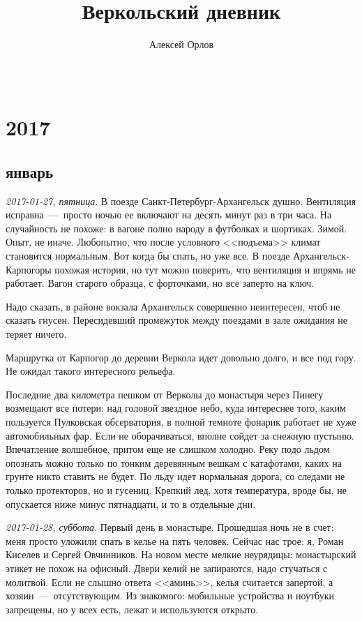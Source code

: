 \documentclass[
    12pt
    ,a4paper
    ,oneside
    ,russian
]{memoir}
\newcommand{\mydatestamp}{
    \bigskip   %
    \emph
}
\newcommand{\mds}{\mydatestamp}
\begin{document}
    \begin{titlingpage}
        \title{Веркольский дневник}
        \author{Алексей Орлов}
        \date{~}
        \maketitle
    \end{titlingpage}
    
    \chapter*{2017}
    \section*{январь}
    
    \mds{2017-01-27, пятница}. В поезде Санкт-Петербург-Архангельск душно. Вентиляция исправна~---~просто ночью ее включают на десять минут раз в три часа. На случайность не похоже: в вагоне полно народу в футболках и шортиках. Зимой. Опыт, не иначе. Любопытно, что после условного <<подъема>> климат становится нормальным. Вот когда бы спать, но уже все. В поезде Архангельск-Карпогоры похожая история, но тут можно поверить, что вентиляция и впрямь не работает. Вагон старого образца, с форточками, но все заперто на ключ.
    
    Надо сказать, в районе вокзала Архангельск совершенно неинтересен, чтоб не сказать гнусен. Пересидевший промежуток между поездами в зале ожидания не теряет ничего.
    
    Маршрутка от Карпогор до деревни Веркола идет довольно долго, и все под гору. Не ожидал такого интересного рельефа.
    
    Последние два километра пешком от Верколы до монастыря через Пинегу возмещают все потери: над головой звездное небо, куда интереснее того, каким пользуется Пулковская обсерватория, в полной темноте фонарик работает не хуже автомобильных фар. Если не оборачиваться, вполне сойдет за снежную пустыню. Впечатление волшебное, притом еще не слишком холодно. Реку подо льдом опознать можно только по тонким деревянным вешкам с катафотами, каких на грунте никто ставить не будет. По льду идет нормальная дорога, со следами не только протекторов, но и гусениц. Крепкий лед, хотя температура, вроде бы, не опускается ниже минус пятнадцати, и то в отдельные дни.
    
    \mds{2017-01-28, суббота}. Первый день в монастыре. Прошедшая ночь не в счет: меня просто уложили спать в келье на пять человек. Сейчас нас трое: я, Роман Киселев и Сергей Овчинников. На новом месте мелкие неурядицы: монастырский этикет не похож на офисный. Двери келий не запираются, надо стучаться с молитвой. Если не слышно ответа <<аминь>>, келья считается запертой, а хозяин~---~отсутствующим. Из знакомого: мобильные устройства и ноутбуки запрещены, но у всех есть, лежат и используются открыто.
    
\end{document}
